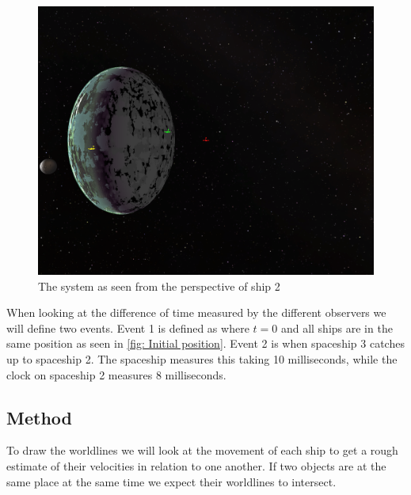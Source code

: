 \documentclass[reprint,english,notitlepage]{revtex4-2}
\begin{document}
  \begin{figure}[h!]
    \centering
    \includegraphics[scale = .125]{figures/2_perspective.png}
    \caption{The system as seen from the perspective of ship 2}
    \label{fig: Situation 2}
  \end{figure}
  
  When looking at the difference of time measured by the different observers we will define two events. Event 1 is defined as where $ t = 0 $ and all ships are in the same position as seen in \ref{fig: Initial position}. Event 2 is when spaceship 3 catches up to spaceship 2. The spaceship measures this taking 10 milliseconds, while the clock on spaceship 2 measures 8 milliseconds. 

  \subsection{Method}
  To draw the worldlines we will look at the movement of each ship to get a rough estimate of their velocities in relation to one another. If two objects are at the same place at the same time we expect their worldlines to intersect.
\end{document}
